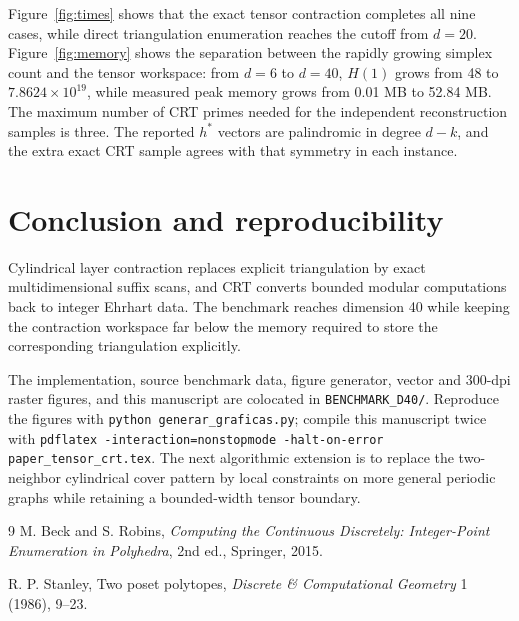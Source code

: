 \documentclass[11pt]{article}
\begin{document}
Figure~\ref{fig:times} shows that the exact tensor contraction completes all
nine cases, while direct triangulation enumeration reaches the cutoff from
$d=20$.  Figure~\ref{fig:memory} shows the separation between the rapidly
growing simplex count and the tensor workspace: from $d=6$ to $d=40$,
$H(1)$ grows from 48 to $7.8624\times10^{19}$, while measured peak memory
grows from 0.01 MB to 52.84 MB.  The maximum number of CRT primes needed for
the independent reconstruction samples is three.  The reported $h^*$
vectors are palindromic in degree $d-k$, and the extra exact CRT sample
agrees with that symmetry in each instance.

\section{Conclusion and reproducibility}

Cylindrical layer contraction replaces explicit triangulation by exact
multidimensional suffix scans, and CRT converts bounded modular
computations back to integer Ehrhart data.  The benchmark reaches dimension
40 while keeping the contraction workspace far below the memory required
to store the corresponding triangulation explicitly.

The implementation, source benchmark data, figure generator, vector and
300-dpi raster figures, and this manuscript are colocated in
\texttt{BENCHMARK\_D40/}.  Reproduce the figures with
\texttt{python generar\_graficas.py}; compile this manuscript twice with
\texttt{pdflatex -interaction=nonstopmode -halt-on-error
paper\_tensor\_crt.tex}.  The next algorithmic extension is to replace the
two-neighbor cylindrical cover pattern by local constraints on more
general periodic graphs while retaining a bounded-width tensor boundary.

\begin{thebibliography}{9}
M. Beck and S. Robins,
\emph{Computing the Continuous Discretely: Integer-Point Enumeration in
Polyhedra}, 2nd ed., Springer, 2015.

R. P. Stanley,
Two poset polytopes,
\emph{Discrete \& Computational Geometry} 1 (1986), 9--23.
\end{thebibliography}
\end{document}
